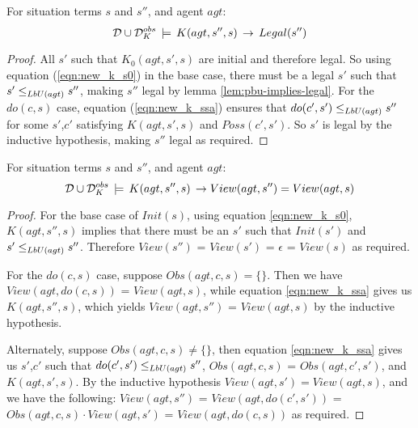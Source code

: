 \begin{lemma}
\label{lem:K-implies-legal}For situation terms $s$ and $s''$, and
agent $agt$:\[
\mathcal{D}\cup\mathcal{D}_{K}^{obs}\,\models\, K(agt,s'',s)\,\rightarrow\, Legal(s'')\]

\end{lemma}
\begin{proof}
All $s'$ such that $K_{0}(agt,s',s)$ are initial and therefore legal.
So using equation (\ref{eqn:new_k_s0}) in the base case, there must
be a legal $s'$ such that $s'\leq_{LbU(agt)}s''$, making $s''$
legal by lemma \ref{lem:pbu-implies-legal}. For the $do(c,s)$ case,
equation (\ref{eqn:new_k_ssa}) ensures that $do(c',s')\leq_{LbU(agt)}s''$
for some $s'$,$c'$ satisfying $K(agt,s',s)$ and $Poss(c',s')$.
So $s'$ is legal by the inductive hypothesis, making $s''$ legal
as required. 
\end{proof}
\medskip{}


\begin{lemma}
\label{lem:K-implies-view}For situation terms $s$ and $s''$, and
agent $agt$:\[
\mathcal{D}\cup\mathcal{D}_{K}^{obs}\,\models\, K(agt,s'',s)\,\rightarrow View(agt,s'')=View(agt,s)\]

\end{lemma}
\begin{proof}
For the base case of $Init(s)$, using equation \eqref{eqn:new_k_s0},
$K(agt,s'',s)$ implies that there must be an $s'$ such that $Init(s')$
and $s'\leq_{LbU(agt)}s''$. Therefore $View(s'')$ = $View(s')$
= $\epsilon$ = $View(s)$ as required.

For the $do(c,s)$ case, suppose $Obs(agt,c,s)=\{\}$. Then we have
$View(agt,do(c,s))$ = $View(agt,s)$, while equation \eqref{eqn:new_k_ssa}
gives us $K(agt,s'',s)$, which yields $View(agt,s'')$ = $View(agt,s)$
by the inductive hypothesis.

Alternately, suppose $Obs(agt,c,s)\neq\{\}$, then equation \eqref{eqn:new_k_ssa}
gives us $s'$,$c'$ such that $do(c',s')\leq_{LbU(agt)}s''$, $Obs(agt,c,s)$
= $Obs(agt,c',s')$, and $K(agt,s',s)$. By the inductive hypothesis
$View(agt,s')=View(agt,s)$, and we have the following: $View(agt,s'')$
= $View(agt,do(c',s'))$ = $Obs(agt,c,s)\cdot View(agt,s')$ = $View(agt,do(c,s))$
as required. 
\end{proof}
\medskip{}


